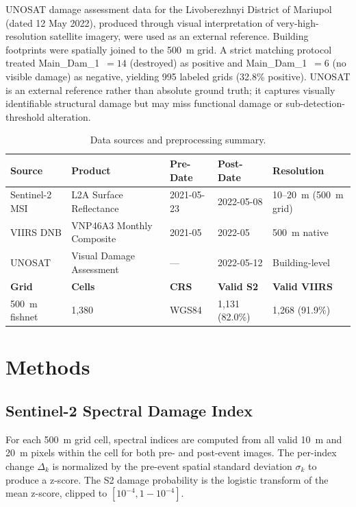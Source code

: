 \documentclass[wcp]{jmlr}
\begin{document}
UNOSAT damage assessment data for the Livoberezhnyi District of Mariupol
(dated 12 May 2022), produced through visual interpretation of
very-high-resolution satellite imagery, were used as an external reference.
Building footprints were spatially joined to the 500~m grid. A strict
matching protocol treated Main\_Dam\_1~$=14$ (destroyed) as positive and
Main\_Dam\_1~$=6$ (no visible damage) as negative, yielding 995 labeled
grids (32.8\% positive). UNOSAT is an external reference rather than
absolute ground truth; it captures visually identifiable structural damage
but may miss functional damage or sub-detection-threshold alteration.

\begin{table}[htp]
\centering
\caption{Data sources and preprocessing summary.}
\label{tab:data}
\begin{tabular}{@{}lllll@{}}
\toprule
\textbf{Source} & \textbf{Product} & \textbf{Pre-Date} & \textbf{Post-Date} & \textbf{Resolution} \\
\midrule
Sentinel-2 MSI  & L2A Surface Reflectance  & 2021-05-23 & 2022-05-08 & 10--20~m (500~m grid) \\
VIIRS DNB       & VNP46A3 Monthly Composite & 2021-05    & 2022-05    & 500~m native \\
UNOSAT          & Visual Damage Assessment  & ---        & 2022-05-12 & Building-level \\
\midrule
\textbf{Grid}   & \textbf{Cells} & \textbf{CRS} & \textbf{Valid S2} & \textbf{Valid VIIRS} \\
500~m fishnet   & 1{,}380        & WGS84        & 1{,}131 (82.0\%)   & 1{,}268 (91.9\%) \\
\bottomrule
\end{tabular}
\end{table}

\section{Methods}\label{sec:methods}

\subsection{Sentinel-2 Spectral Damage Index}

For each 500~m grid cell, spectral indices are computed from all valid
10~m and 20~m pixels within the cell for both pre- and post-event images.
The per-index change $\Delta_k$ is normalized by the pre-event spatial
standard deviation $\sigma_k$ to produce a z-score. The S2 damage
probability is the logistic transform of the mean z-score, clipped to
$[10^{-4}, 1-10^{-4}]$.
\end{document}
